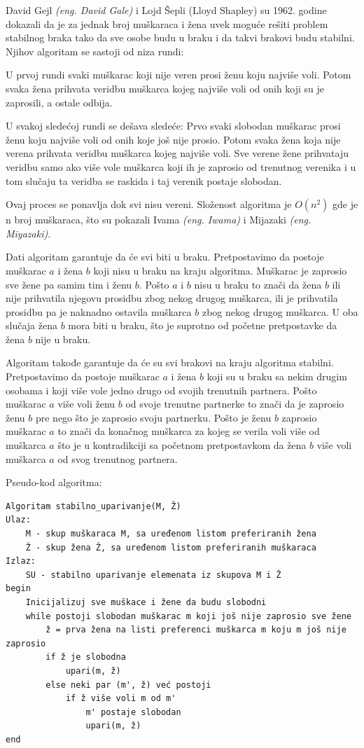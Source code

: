 \documentclass[a4paper]{article}
\begin{document}
David Gejl \textit{(eng. David Gale)} i Lojd Šepli (Lloyd Shapley) su 1962. godine dokazali da je za jednak broj muškaraca i žena uvek moguće rešiti problem stabilnog braka tako da sve osobe budu u braku i da takvi brakovi budu stabilni\cite{galeShapley}. Njihov algoritam se sastoji od niza rundi:

U prvoj rundi svaki muškarac koji nije veren prosi ženu koju najviše voli. Potom svaka žena prihvata veridbu muškarca kojeg najviše voli od onih koji su je zaprosili, a ostale odbija.

U svakoj sledećoj rundi se dešava sledeće: Prvo svaki slobodan muškarac prosi ženu koju najviše voli od onih koje još nije prosio. Potom svaka žena koja nije verena prihvata veridbu muškarca kojeg najviše voli. Sve verene žene prihvataju veridbu samo ako više vole muškarca koji ih je zaprosio od trenutnog verenika i u tom slučaju ta veridba se raskida i taj verenik postaje slobodan. 

Ovaj proces se ponavlja dok svi nisu vereni. Složenost algoritma je $O(n^2)$ gde je n broj muškaraca, što su pokazali Ivama \textit{(eng. Iwama)} i Mijazaki \textit{(eng. Miyazaki)}\cite{slozenost}. 

Dati algoritam garantuje da će svi biti u braku. Pretpostavimo da postoje muškarac $a$ i žena $b$ koji nisu u braku na kraju algoritma. Muškarac je zaprosio sve žene pa samim tim i ženu $b$. Pošto $a$ i $b$ nisu u braku to znači da žena $b$ ili nije prihvatila njegovu prosidbu zbog nekog drugog muškarca, ili je prihvatila prosidbu pa je naknadno ostavila muškarca $b$ zbog nekog drugog muškarca. U oba slučaja žena $b$ mora biti u braku, što je suprotno od početne pretpostavke da žena $b$ nije u braku.

Algoritam takođe garantuje da će su svi brakovi na kraju algoritma stabilni. Pretpostavimo da postoje muškarac $a$ i žena $b$ koji su u braku sa nekim drugim osobama i koji više vole jedno drugo od svojih trenutnih partnera. Pošto muškarac $a$ više voli ženu $b$ od svoje trenutne partnerke to znači da je zaprosio ženu $b$ pre nego što je zaprosio svoju partnerku. Pošto je ženu $b$ zaprosio muškarac $a$ to znači da konačnog muškarca za kojeg se verila voli više od muškarca $a$ što je u kontradikciji sa početnom pretpostavkom da žena $b$ više voli muškarca $a$ od svog trenutnog partnera.

\newpage

Pseudo-kod algoritma:
\begin{verbatim}
Algoritam stabilno_uparivanje(M, Ž)
Ulaz:
	M - skup muškaraca M, sa uređenom listom preferiranih žena
	Ž - skup žena Ž, sa uređenom listom preferiranih muškaraca
Izlaz:
	SU - stabilno uparivanje elemenata iz skupova M i Ž
begin
    Inicijalizuj sve muškace i žene da budu slobodni
    while postoji slobodan muškarac m koji još nije zaprosio sve žene
        ž = prva žena na listi preferenci muškarca m koju m još nije zaprosio
        if ž je slobodna
            upari(m, ž)
        else neki par (m', ž) već postoji
            if ž više voli m od m'
                m' postaje slobodan
                upari(m, ž)
end
\end{verbatim}
\end{document}
